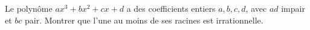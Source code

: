 Le polynôme $ax^3 + bx^2 + cx + d$ a des coefficients entiers $a, b, c, d$, avec $ad$ impair et $bc$ pair. Montrer que l'une au moins de ses racines est irrationnelle.
